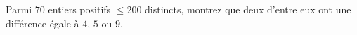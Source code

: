Parmi $70$ entiers positifs $\leq 200$ distincts, montrez que deux d'entre
eux ont une différence égale à $4$, $5$ ou $9$.
